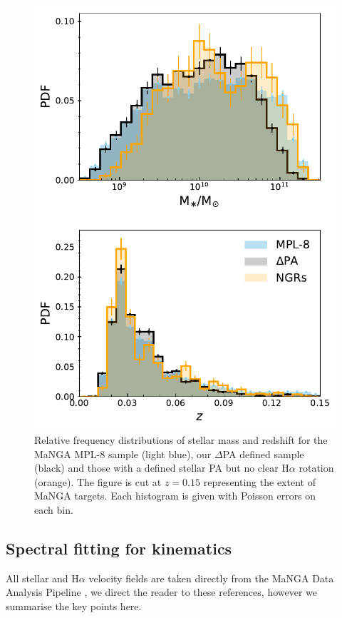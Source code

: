 \documentclass[fleqn,usenatbib]{mnras}
\begin{document}
\begin{figure}
	\includegraphics[width=\linewidth]{total_pop/mpl8_pa_stelmass_z.pdf}
    \caption{Relative frequency distributions of stellar mass and redshift for the MaNGA MPL-8 sample (light blue), our $\Delta$PA defined sample (black) and those with a defined stellar PA but no clear H$\alpha$ rotation (orange). The figure is cut at $z=0.15$ representing the extent of MaNGA targets. Each histogram is given with Poisson errors on each bin.}
    \label{fig:samp_cons}
\end{figure}

\subsection{Spectral fitting for kinematics}
All stellar and H$\alpha$ velocity fields are taken directly from the MaNGA Data Analysis Pipeline \citep[DAP;][for an overview and emission line modelling respectively]{westfall2019, belfoire2019}, we direct the reader to these references, however we summarise the key points here.
\end{document}

